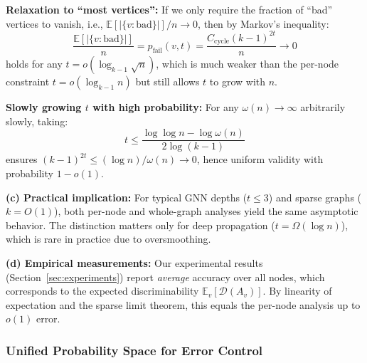 \begin{remark}
\textbf{Relaxation to ``most vertices'':} If we only require the fraction of ``bad'' vertices to vanish, i.e., $\mathbb{E}[|\{v: \text{bad}\}|]/n \to 0$, then by Markov's inequality:
\begin{equation}
    \frac{\mathbb{E}[|\{v: \text{bad}\}|]}{n} = p_{\mathrm{fail}}(v, t) = \frac{C_{\mathrm{cycle}} (k-1)^{2t}}{n} \to 0
\end{equation}
holds for any $t = o(\log_{k-1} \sqrt{n})$, which is much weaker than the per-node constraint $t = o(\log_{k-1} n)$ but still allows $t$ to grow with $n$.

\textbf{Slowly growing $t$ with high probability:} For any $\omega(n) \to \infty$ arbitrarily slowly, taking:
\begin{equation}
    t \leq \frac{\log\log n - \log\omega(n)}{2\log(k-1)}
\end{equation}
ensures $(k-1)^{2t} \leq (\log n)/\omega(n) \to 0$, hence uniform validity with probability $1 - o(1)$.

\textbf{(c) Practical implication:} For typical GNN depths ($t \leq 3$) and sparse graphs ($k = O(1)$), both per-node and whole-graph analyses yield the same asymptotic behavior. The distinction matters only for deep propagation ($t = \Omega(\log n)$), which is rare in practice due to oversmoothing.

\textbf{(d) Empirical measurements:} Our experimental results (Section~\ref{sec:experiments}) report \textit{average} accuracy over all nodes, which corresponds to the expected discriminability $\mathbb{E}_v[\mathcal{D}(A_v)]$. By linearity of expectation and the sparse limit theorem, this equals the per-node analysis up to $o(1)$ error.
\end{remark}

\subsubsection{Unified Probability Space for Error Control}

